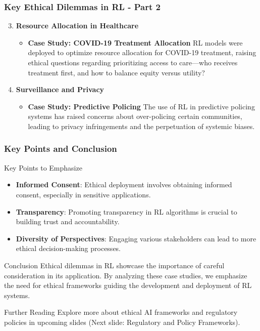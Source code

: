 \documentclass[aspectratio=169]{beamer}
\begin{document}
\begin{frame}[fragile]
    \frametitle{Key Ethical Dilemmas in RL - Part 2}
    \begin{enumerate}
        \setcounter{enumi}{2}
        \item \textbf{Resource Allocation in Healthcare}  
            \begin{itemize}
                \item \textbf{Case Study: COVID-19 Treatment Allocation}  
                RL models were deployed to optimize resource allocation for COVID-19 treatment, raising ethical questions regarding prioritizing access to care—who receives treatment first, and how to balance equity versus utility?
            \end{itemize}
        \item \textbf{Surveillance and Privacy}  
            \begin{itemize}
                \item \textbf{Case Study: Predictive Policing}  
                The use of RL in predictive policing systems has raised concerns about over-policing certain communities, leading to privacy infringements and the perpetuation of systemic biases.
            \end{itemize}
    \end{enumerate}
\end{frame}

\begin{frame}[fragile]
    \frametitle{Key Points and Conclusion}
    \begin{block}{Key Points to Emphasize}
        \begin{itemize}
            \item \textbf{Informed Consent}: Ethical deployment involves obtaining informed consent, especially in sensitive applications.
            \item \textbf{Transparency}: Promoting transparency in RL algorithms is crucial to building trust and accountability.
            \item \textbf{Diversity of Perspectives}: Engaging various stakeholders can lead to more ethical decision-making processes.
        \end{itemize}
    \end{block}
    
    \begin{block}{Conclusion}
        Ethical dilemmas in RL showcase the importance of careful consideration in its application. 
        By analyzing these case studies, we emphasize the need for ethical frameworks guiding the development and deployment of RL systems.
    \end{block}
    
    \begin{block}{Further Reading}
        Explore more about ethical AI frameworks and regulatory policies in upcoming slides (Next slide: Regulatory and Policy Frameworks).
    \end{block}
\end{frame}
\end{document}
